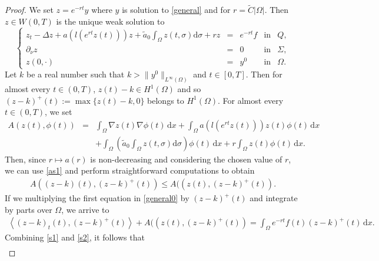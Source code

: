 \documentclass[reqno,twoside]{amsart}
\numberwithin{equation}{section}
\theoremstyle{definition}
\numberwithin{equation}{section}
\def \dis {\displaystyle}
\def \dx{\mathrm{d}x}
\def \d {\mathrm{d}}
\begin{document}
\begin{proof}
	We set $z=e^{-rt}y$ where $y$ is solution to \eqref{general} and for $r=\tilde{C}|\Omega|$. Then $z\in W(0,T)$ is the unique weak solution to
	\begin{equation}\label{general0}
		\left\{
		\begin{array}{rllll}
			\dis z_t-\Delta z+a(l(e^{rt}z(t)))z+\tilde{a}_0\int_{\Omega}z(t,\sigma)\d \sigma+rz &=& e^{-rt}f &\mbox{in}& Q,\\
			\dis \partial_{\nu}z&=&0  &\mbox{in}& \Sigma,\\
			z(0,\cdot)&=& y^0 &\mbox{in}& \Omega.
		\end{array}
		\right.
	\end{equation}
	Let $k$ be a real number such that $k>\|y^0\|_{L^\infty(\Omega)}$ and $t\in [0,T]$.  Then  for almost every $t\in (0,T)$, $z(t)-k\in H^1(\Omega)$ and so $(z-k)^+(t):=\max\{z(t)-k,0\}$ belongs to $H^1(\Omega)$.  For almost every $t\in (0,T)$, we set
	\begin{equation}\label{defA}
		\begin{array}{lll}
			\dis A(z(t), \phi(t))&=&\dis \int_{\Omega}\nabla z(t)\nabla \phi(t)\,\dx+ \int_{\Omega}a(l(e^{rt}z(t)))z(t)\phi(t)\,\dx\\
			&&\dis +\int_{\Omega}\left(\tilde{a}_0 \dis \int_{\Omega}z(t,\sigma)\d\sigma\right)\phi(t)\, \dx+ r\int_{\Omega}z(t)\phi(t)\,\dx.
		\end{array}
	\end{equation}
	Then, since $r\mapsto a(r)$ is non-decreasing and considering the chosen value of $r$, we can use \eqref{as1} and perform straightforward computations to obtain
	\begin{equation}\label{s1}
		\begin{array}{lll}
			\dis A((z-k)(t), (z-k)^+(t))\leq\dis A((z(t), (z-k)^+(t)).
		\end{array}
	\end{equation}
	If we multiplying the first equation in \eqref{general0} by $(z-k)^+(t)$ and integrate by parts over $\Omega$, we arrive to
	\begin{equation}\label{s2}
		\begin{array}{lll}
			\left\langle (z-k)_t(t),(z-k)^+(t)\right\rangle+\dis A((z(t), (z-k)^+(t))=\int_{\Omega}e^{-rt}f(t)(z-k)^+(t)\,\dx.
		\end{array}
	\end{equation}
	Combining \eqref{s1} and \eqref{s2}, it follows that
	$$
	\begin{array}{lll}

\end{array}$$
\end{proof}
\end{document}
